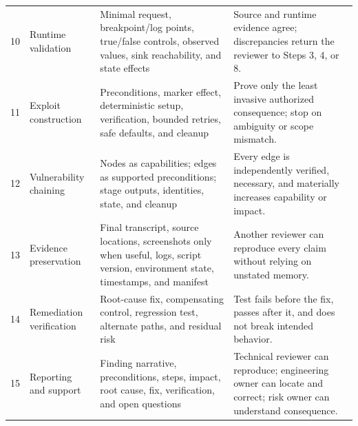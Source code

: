 \documentclass[11pt]{article}
\begin{document}
\begin{longtable}{@{}L{0.055\textwidth}L{0.16\textwidth}L{0.33\textwidth}L{0.34\textwidth}@{}}
10 & Runtime validation & Minimal request, breakpoint/log points, true/false controls, observed values, sink reachability, and state effects & Source and runtime evidence agree; discrepancies return the reviewer to Steps 3, 4, or 8. \\
11 & Exploit construction & Preconditions, marker effect, deterministic setup, verification, bounded retries, safe defaults, and cleanup & Prove only the least invasive authorized consequence; stop on ambiguity or scope mismatch. \\
12 & Vulnerability chaining & Nodes as capabilities; edges as supported preconditions; stage outputs, identities, state, and cleanup & Every edge is independently verified, necessary, and materially increases capability or impact. \\
13 & Evidence preservation & Final transcript, source locations, screenshots only when useful, logs, script version, environment state, timestamps, and manifest & Another reviewer can reproduce every claim without relying on unstated memory. \\
14 & Remediation verification & Root-cause fix, compensating control, regression test, alternate paths, and residual risk & Test fails before the fix, passes after it, and does not break intended behavior. \\
15 & Reporting and support & Finding narrative, preconditions, steps, impact, root cause, fix, verification, and open questions & Technical reviewer can reproduce; engineering owner can locate and correct; risk owner can understand consequence. \\
\bottomrule
\end{longtable}
\normalsize
\end{document}
